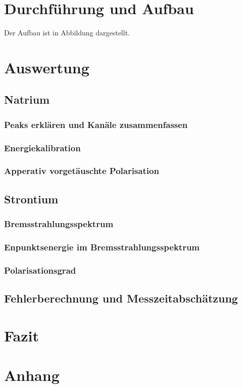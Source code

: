 \documentclass[twoside,colorback,accentcolor=tud4c,11pt]{tudreport}
\begin{document}
\chapter{Durchführung und Aufbau}
Der Aufbau ist in Abbildung    dargestellt. 
  
     	
\chapter{Auswertung}
\section{Natrium}
\subsection{Peaks erklären und Kanäle zusammenfassen}
\subsection{Energiekalibration}
\subsection{Apperativ vorgetäuschte Polarisation}
\section{Strontium}
\subsection{Bremsstrahlungsspektrum}
\subsection{Enpunktsenergie im Bremsstrahlungsspektrum}
\subsection{Polarisationsgrad}
\section{Fehlerberechnung und Messzeitabschätzung}

\chapter{Fazit}


\chapter{Anhang}





		

\renewcommand{\bibname}{Literaturverzeichnis}
\begin{thebibliography}{Bak89}



\end{thebibliography} 	
\end{document}
